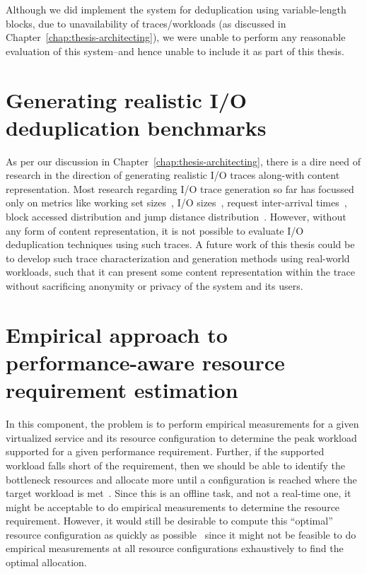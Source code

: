 Although we did implement the system for deduplication using
variable-length blocks, due to unavailability of traces/workloads (as 
discussed in Chapter~\ref{chap:thesis-architecting}), we were unable 
to perform any reasonable evaluation of this system--and hence unable 
to include it as part of this thesis.

\section{Generating realistic I/O deduplication benchmarks}
As per our discussion in Chapter~\ref{chap:thesis-architecting}, there
is a dire need of research in the direction of generating
realistic I/O traces along-with content representation. Most research
regarding I/O trace generation so far has focussed only on metrics
like working set sizes~\cite{working-set}, 
I/O sizes~\cite{flexi-replay}, 
request inter-arrival times~\cite{storagereplay},
block accessed distribution and
jump distance distribution~\cite{jump-based-synthetic}. However, 
without any form of content representation, it is not possible
to evaluate I/O deduplication techniques using such traces. 
A future work of this thesis could be to develop such trace 
characterization and generation methods using real-world
workloads, such that it can present some
content representation within the trace without sacrificing 
anonymity or privacy of the system and its users.


\section{Empirical approach to performance-aware resource requirement 
estimation}

In this component, the problem is to perform empirical measurements
for a given virtualized service and its resource configuration to
determine the peak workload supported for a given performance
requirement. Further, if the supported workload falls short of the
requirement, then we should be able to identify the
bottleneck resources and allocate more until a configuration is
reached where the target workload is met~\cite{sandpiper}.
Since this is an offline task,
and not a real-time one, it might be acceptable to do empirical
measurements to determine
the resource requirement. However, it would still be
desirable to compute this ``optimal'' resource configuration
as quickly as possible~\cite{cutting-corners} since it might not be feasible to
do empirical measurements at all resource configurations exhaustively
to find the optimal allocation.

